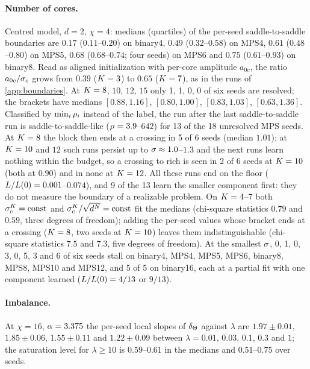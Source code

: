 \paragraph{Number of cores.}
\empirical{} Centred model, $d=2$, $\chi=4$: medians (quartiles) of the per-seed saddle-to-saddle boundaries are
$0.17$ ($0.11$--$0.20$) on binary4, $0.49$ ($0.32$--$0.58$) on MPS4, $0.61$ ($0.48$--$0.80$) on MPS5, $0.68$
($0.68$--$0.74$; four seeds) on MPS6 and $0.75$ ($0.61$--$0.93$) on binary8. Read as aligned initialization with
per-core amplitude $a_{0c}$, the ratio $a_{0c}/\sigma_c$ grows from $0.39$ ($K=3$) to $0.65$ ($K=7$), as in the runs of
\cref{app:boundaries}. At $K=8$, $10$, $12$, $15$ only 1, 1, 0, 0 of six seeds are resolved; the
brackets have medians $[0.88,1.16]$, $[0.80,1.00]$, $[0.83,1.03]$, $[0.63,1.36]$. Classified by $\min_i\rho_{i}$ instead
of the label, the run after the last saddle-to-saddle run is saddle-to-saddle-like ($\rho_{}=3.9$--$642$) for 13 of
the 18 unresolved MPS seeds. At $K=8$ the block then ends at a crossing in 5 of 6 seeds (median $1.01$); at
$K=10$ and $12$ such runs persist up to $\sigma\approx1.0$--$1.3$ and the next runs learn nothing within the budget,
so a crossing to rich is seen in 2 of 6 seeds at $K=10$ (both at $0.90$) and in none at $K=12$. All these runs
end on the floor ($L/L(0)=0.001$--$0.074$), and 9 of the 13 learn the smaller component first: they do not
measure the boundary of a realizable problem. On $K=4$--$7$ both $\sigma_c^K=\text{const}$ and
$\sigma_c^K/\sqrt{d^N}=\text{const}$ fit the medians (chi-square statistics $0.79$ and $0.59$, three degrees of freedom); adding the
per-seed values whose bracket ends at a crossing ($K=8$, two seeds at $K=10$) leaves them indistinguishable
(chi-square statistics $7.5$ and $7.3$, five degrees of freedom). At the smallest $\sigma$, 0, 1, 0, 3, 0, 5, 3 and 6 of six seeds
stall on binary4, MPS4, MPS5, MPS6, binary8, MPS8, MPS10 and MPS12, and 5 of 5 on binary16, each at a partial fit
with one component learned ($L/L(0)=4/13$ or $9/13$).

\paragraph{Imbalance.}
\empirical{} At $\chi=16$, $\alpha=3.375$ the per-seed local slopes of $\delta_{\Theta}$ against $\lambda$ are $1.97\pm0.01$,
$1.85\pm0.06$, $1.55\pm0.11$ and $1.22\pm0.09$ between $\lambda=0.01$, $0.03$, $0.1$, $0.3$ and $1$; the saturation
level for $\lambda\ge10$ is $0.59$--$0.61$ in the medians and $0.51$--$0.75$ over seeds.

